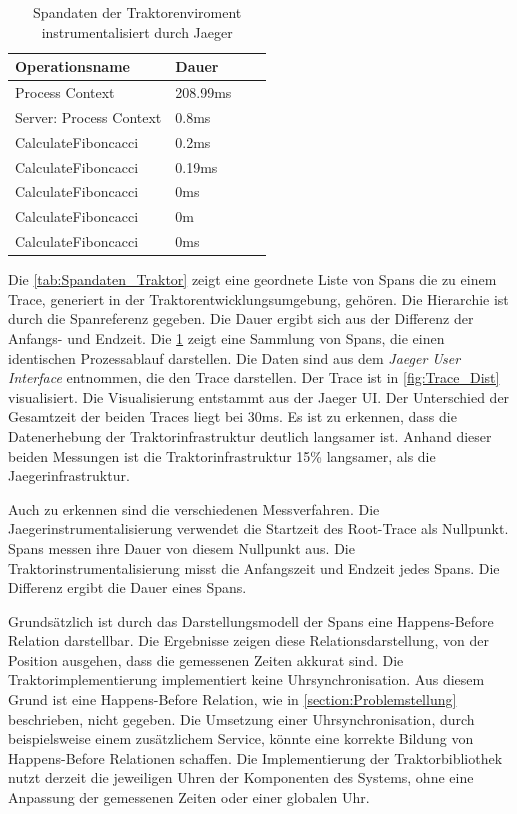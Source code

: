 \begin{table}[]
	\centering
	\begin{tabular}{|l|l|l|l|}
		\hline
		Operationsname          & Dauer 	\\ \hline
		Process Context         & 208.99ms  \\ \hline
		Server: Process Context & 0.8ms 	\\ \hline
		CalculateFiboncacci     & 0.2ms 	\\ \hline
		CalculateFiboncacci     & 0.19ms 	\\ \hline
		CalculateFiboncacci     & 0ms		\\ \hline
		CalculateFiboncacci     & 0m		\\ \hline
		CalculateFiboncacci     & 0ms		\\ \hline
	\end{tabular}
	\caption{Spandaten der Traktorenviroment instrumentalisiert durch Jaeger}
	\label{tab:Spandaten_Jaeger}
\end{table}
Die \cref{tab:Spandaten_Traktor} zeigt eine geordnete Liste von Spans die zu einem Trace, generiert in der Traktorentwicklungsumgebung, gehören. Die Hierarchie ist durch die Spanreferenz gegeben. Die Dauer ergibt sich aus der Differenz der Anfangs- und Endzeit. Die \cref{tab:Spandaten_Jaeger} zeigt eine Sammlung von Spans, die einen identischen Prozessablauf darstellen. Die Daten sind aus dem \emph{Jaeger User Interface} entnommen, die den Trace darstellen. Der Trace ist in \cref{fig:Trace_Dist} visualisiert. Die Visualisierung entstammt aus der Jaeger UI.
Der Unterschied der Gesamtzeit der beiden Traces liegt bei 30ms. Es ist zu erkennen, dass die Datenerhebung der Traktorinfrastruktur deutlich langsamer ist. Anhand dieser beiden Messungen ist die Traktorinfrastruktur 15\% langsamer, als die Jaegerinfrastruktur.

Auch zu erkennen sind die verschiedenen Messverfahren. Die Jaegerinstrumentalisierung verwendet die Startzeit des Root-Trace als Nullpunkt. Spans messen ihre Dauer von diesem Nullpunkt aus. Die Traktorinstrumentalisierung misst die Anfangszeit und Endzeit jedes Spans. Die Differenz ergibt die Dauer eines Spans.

Grundsätzlich ist durch das Darstellungsmodell der Spans eine Happens-Before Relation darstellbar. Die Ergebnisse zeigen diese Relationsdarstellung, von der Position ausgehen, dass die gemessenen Zeiten akkurat sind.  Die Traktorimplementierung implementiert keine Uhrsynchronisation. Aus diesem Grund ist eine Happens-Before Relation, wie in \cref{section:Problemstellung} beschrieben, nicht gegeben. Die Umsetzung einer Uhrsynchronisation, durch beispielsweise einem zusätzlichem Service, könnte eine korrekte Bildung von Happens-Before Relationen schaffen. Die Implementierung der Traktorbibliothek nutzt derzeit die jeweiligen Uhren der Komponenten des Systems, ohne eine Anpassung der gemessenen Zeiten oder einer globalen Uhr.

